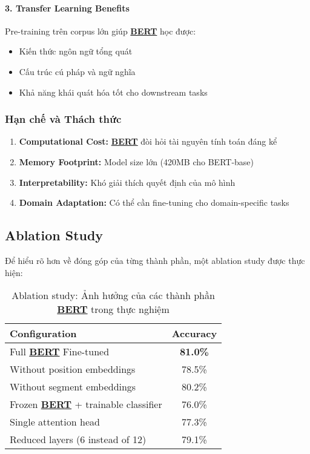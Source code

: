     \paragraph{3.
    Transfer Learning Benefits}
    Pre-training trên corpus lớn giúp \hyperref[acro:bert]{\textbf{BERT}} học được:
    \begin{itemize}
        \item Kiến thức ngôn ngữ tổng quát
        \item Cấu trúc cú pháp và ngữ nghĩa
        \item Khả năng khái quát hóa tốt cho downstream tasks
    \end{itemize}
    
    \subsubsection{Hạn chế và Thách thức}
    
    \begin{enumerate}
        \item \textbf{Computational Cost:} \hyperref[acro:bert]{\textbf{BERT}} đòi hỏi tài nguyên tính toán đáng kể
        \item \textbf{Memory Footprint:} Model size lớn (420MB cho BERT-base)
        \item \textbf{Interpretability:} Khó giải thích quyết định của mô hình
        \item \textbf{Domain Adaptation:} Có thể cần fine-tuning cho domain-specific
        tasks
    \end{enumerate}
    
    \subsection{Ablation Study}
    \label{ssec:ablation_study_exp}
    
    Để hiểu rõ hơn về đóng góp của từng thành phần, một ablation study được thực hiện:
    
    \begin{table}[H]
    \centering
    \caption{Ablation study: Ảnh hưởng của các thành phần \hyperref[acro:bert]{\textbf{BERT}} trong thực nghiệm}
    \label{tab:ablation}
    \begin{tabular}{lc}
    \toprule
    \textbf{Configuration} & \textbf{Accuracy} \\
    \midrule
    Full \hyperref[acro:bert]{\textbf{BERT}} Fine-tuned & \textbf{81.0\%} \\
    Without position embeddings & 78.5\% \\
    Without segment embeddings & 80.2\% \\
    Frozen \hyperref[acro:bert]{\textbf{BERT}} + trainable classifier & 76.0\% \\
    Single attention head & 77.3\% \\
    Reduced layers (6 instead of 12) & 79.1\% \\
    \bottomrule
    \end{tabular}
    \end{table}
    
